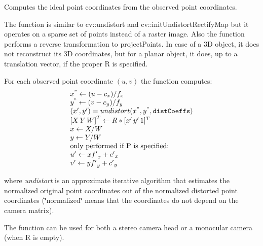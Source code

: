 Computes the ideal point coordinates from the observed point coordinates. 

The function is similar to cv\+::undistort and cv\+::init\+Undistort\+Rectify\+Map but it operates on a sparse set of points instead of a raster image. Also the function performs a reverse transformation to project\+Points. In case of a 3D object, it does not reconstruct its 3D coordinates, but for a planar object, it does, up to a translation vector, if the proper R is specified. 

For each observed point coordinate $(u, v)$ the function computes\+: \[ \begin{array}{l} x^{"} \leftarrow (u - c_x)/f_x \\ y^{"} \leftarrow (v - c_y)/f_y \\ (x',y') = undistort(x^{"},y^{"}, \texttt{distCoeffs}) \\ {[X\,Y\,W]} ^T \leftarrow R*[x' \, y' \, 1]^T \\ x \leftarrow X/W \\ y \leftarrow Y/W \\ \text{only performed if P is specified:} \\ u' \leftarrow x {f'}_x + {c'}_x \\ v' \leftarrow y {f'}_y + {c'}_y \end{array} \] 

where {\itshape undistort} is an approximate iterative algorithm that estimates the normalized original point coordinates out of the normalized distorted point coordinates (\char`\"{}normalized\char`\"{} means that the coordinates do not depend on the camera matrix). 

The function can be used for both a stereo camera head or a monocular camera (when R is empty). 


